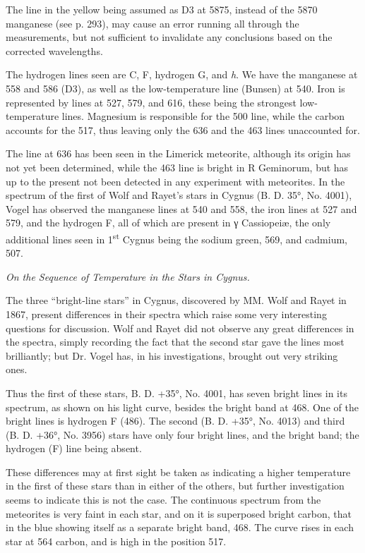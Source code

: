 \documentclass[a4paper, 12pt, oneside, polutonikogreek, english]{article}
\begin{document}
The line in the yellow being assumed as D3 at 5875, instead of the 5870 manganese (see p. 293), may cause an error running all through the measurements, but not sufficient to invalidate any conclusions based on the corrected wavelengths.

The hydrogen lines seen are C, F, hydrogen G, and \emph{h}. We have the manganese at 558 and 586 (D3), as well as the low-temperature line (Bunsen) at 540. Iron is represented by lines at 527, 579, and 616, these being the strongest low-temperature lines. Magnesium is responsible for the 500 line, while the carbon accounts for the 517, thus leaving only the 636 and the 463 lines unaccounted for.

The line at 636 has been seen in the Limerick meteorite, although its origin has not yet been determined, while the 463 line is bright in R Geminorum, but has up to the present not been detected in any experiment with meteorites. In the spectrum of the first of Wolf and Rayet's stars in Cygnus (B. D. 35°, No. 4001), Vogel has observed the manganese lines at 540 and 558, the iron lines at 527 and 579, and the hydrogen F, all of which are present in γ Cassiopeiæ, the only additional lines seen in 1\textsuperscript{st} Cygnus being the sodium green, 569, and cadmium, 507.

\emph{On the Sequence of Temperature in the Stars in Cygnus.}

The three ``bright-line stars'' in Cygnus, discovered by MM. Wolf and Rayet in 1867, present differences in their spectra which raise some very interesting questions for discussion. Wolf and Rayet did not observe any great differences in the spectra, simply recording the fact that the second star gave the lines most brilliantly; but Dr. Vogel has, in his investigations, brought out very striking ones.

Thus the first of these stars, B. D. +35°, No. 4001, has seven bright lines in its spectrum, as shown on his light curve, besides the bright band at 468. One of the bright lines is hydrogen F (486). The second (B. D. +35°, No. 4013) and third (B. D. +36°, No. 3956) stars have only four bright lines, and the bright band; the hydrogen (F) line being absent.

These differences may at first sight be taken as indicating a higher temperature in the first of these stars than in either of the others, but further investigation seems to indicate this is not the case. The continuous spectrum from the meteorites is very faint in each star, and on it is superposed bright carbon, that in the blue showing itself as a separate bright band, 468. The curve rises in each star at 564 carbon, and is high in the position 517.
\end{document}
